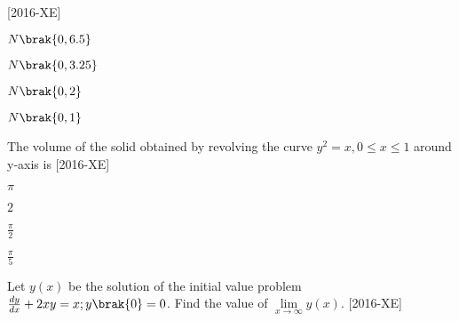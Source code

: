     \hfill{[2016-XE]}
\begin{enumerate}
\begin{multicols}{4}
\item $N\brak{0,6.5}$
\item $N\brak{0,3.25}$
\item $N\brak{0,2}$
\item $N\brak{0,1}$
\end{multicols}
\end{enumerate}
\item The volume of the solid obtained by revolving the curve $y^2=x, 0\leq x \leq 1$ around y-axis is \hfill{[2016-XE]}
\begin{enumerate}
\begin{multicols}{4}
\item $\pi$
\item $2$
\item $\frac{\pi}{2}$
\item $\frac{\pi}{5}$
\end{multicols}
\end{enumerate}
\item Let $y(x)$ be the solution of the initial value problem $\frac{dy}{dx}+2xy=x; y\brak{0}=0$. Find the value of $\lim\limits_{x\to \infty} y(x)$. \hfill{[2016-XE]}
